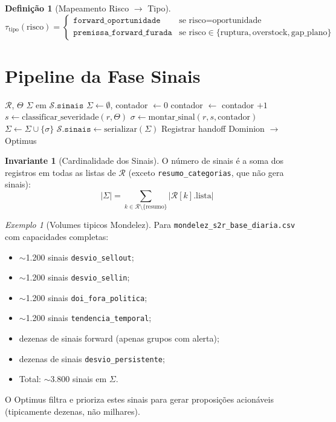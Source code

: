 \documentclass[a4paper, 12pt]{report}
\theoremstyle{definition}
\newtheorem{definicao}{Defini\c{c}\~ao}[chapter]
\newtheorem{invariante}{Invariante}[chapter]
\theoremstyle{remark}
\newtheorem{exemplo}{Exemplo}[chapter]
\newcommand{\state}{\mathcal{S}}
\begin{document}
\begin{definicao}[Mapeamento Risco $\to$ Tipo]
  \[
    \tau_{\text{tipo}}(\text{risco}) = \begin{cases}
      \texttt{forward\_oportunidade} & \text{se risco} = \text{oportunidade} \\
      \texttt{premissa\_forward\_furada} & \text{se risco} \in \{\text{ruptura}, \text{overstock}, \text{gap\_plano}\}
    \end{cases}
  \]
\end{definicao}


\section{Pipeline da Fase Sinais}

\begin{algorithm}[H]
\caption{Sinais -- Convers\~ao de Resultados em Evid\^encias}
\begin{algorithmic}[1]
  \Require $\mathcal{R}$, $\Theta$
  \Ensure $\Sigma$ em $\state.\texttt{sinais}$
  \State $\Sigma \gets \emptyset$, contador $\gets 0$
      \State contador $\gets$ contador $+ 1$
      \State $s \gets \text{classificar\_severidade}(r, \Theta)$
      \State $\sigma \gets \text{montar\_sinal}(r, s, \text{contador})$
      \State $\Sigma \gets \Sigma \cup \{\sigma\}$
    \EndFor
  \EndFor
  \State $\state.\texttt{sinais} \gets \text{serializar}(\Sigma)$
  \State Registrar handoff Dominion $\to$ Optimus
\end{algorithmic}
\end{algorithm}

\begin{invariante}[Cardinalidade dos Sinais]
  O n\'umero de sinais \'e a soma dos registros em todas as listas
  de $\mathcal{R}$ (exceto \texttt{resumo\_categorias}, que n\~ao gera sinais):
  \[
    |\Sigma| = \sum_{k \in \mathcal{R} \setminus \{\text{resumo}\}} |\mathcal{R}[k].\text{lista}|
  \]
\end{invariante}

\begin{exemplo}[Volumes tipicos Mondelez]
  Para \texttt{mondelez\_s2r\_base\_diaria.csv} com capacidades completas:
  \begin{itemize}
    \item $\sim$1.200 sinais \texttt{desvio\_sellout};
    \item $\sim$1.200 sinais \texttt{desvio\_sellin};
    \item $\sim$1.200 sinais \texttt{doi\_fora\_politica};
    \item $\sim$1.200 sinais \texttt{tendencia\_temporal};
    \item dezenas de sinais forward (apenas grupos com alerta);
    \item dezenas de sinais \texttt{desvio\_persistente};
    \item Total: $\sim$3.800 sinais em $\Sigma$.
  \end{itemize}
  O Optimus filtra e prioriza estes sinais para gerar proposi\c{c}\~oes
  acion\'aveis (tipicamente dezenas, n\~ao milhares).
\end{exemplo}
\end{document}
